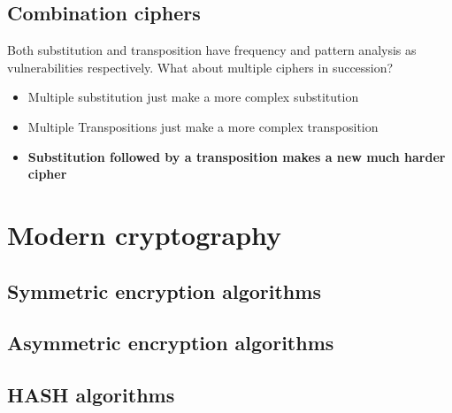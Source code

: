 \documentclass[11pt,british,faculty=ea,layout=titlefont,underline=false,titleUppercase=true,titleUnderline=true,hidelinks]{ugent2016-report}
\begin{document}
		\subsection{Combination ciphers} \label{sub:combination-ciphers}
		Both substitution and transposition have frequency and pattern analysis as vulnerabilities respectively. What about multiple ciphers in succession?
		\begin{itemize}
			\item Multiple substitution just make a more complex substitution
			\item Multiple Transpositions just make a more complex transposition
			\item \textbf{Substitution followed by a transposition makes a new much harder cipher}
		\end{itemize}

	\section{Modern cryptography} \label{sec:modern-cryptography}
		\subsection{Symmetric encryption algorithms} \label{sub:symmetric-encryption-algorithms}

		\subsection{Asymmetric encryption algorithms} \label{sub:asymetric-encryption-algorithms}

		\subsection{HASH algorithms} \label{sub:hash-algorithms}
\printbibliography
\end{document}

